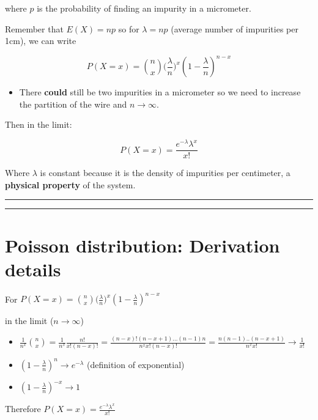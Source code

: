 \documentclass[
]{book}
\providecommand{\tightlist}{%
  \setlength{\itemsep}{0pt}\setlength{\parskip}{0pt}}
\begin{document}
where \(p\) is the probability of finding an impurity in a micrometer.

Remember that
\(E(X)=np\)
so for \(\lambda=np\) (average number of impurities per 1cm), we can write

\[P(X=x)=\binom n x \big(\frac{\lambda}{n}\big)^x(1-\frac{\lambda}{n})^{n-x}\]

\begin{itemize}
\tightlist
\item
  There \textbf{could} still be two impurities in a micrometer so we need to increase the partition of the wire and \(n \rightarrow \infty\).
\end{itemize}

Then in the limit:

\[P(X=x)= \frac{e^{-\lambda}\lambda^x}{x!}\]

Where \(\lambda\) is constant because it is the density of impurities per centimeter, a \textbf{physical property} of the system.

\begin{center}\rule{0.5\linewidth}{0.5pt}\end{center}

\begin{center}\rule{0.5\linewidth}{0.5pt}\end{center}

\hypertarget{poisson-distribution-derivation-details}{%
\section{Poisson distribution: Derivation details}\label{poisson-distribution-derivation-details}}

For \(P(X=x)=\binom n x \big(\frac{\lambda}{n}\big)^x(1-\frac{\lambda}{n})^{n-x}\)

in the limit (\(n \rightarrow \infty\))

\begin{itemize}
\tightlist
\item
  \(\frac{1}{n^x}\binom n x =\frac{1}{n^x}\frac{n!}{x! (n-x)!}=\frac{(n-x)!(n-x+1)...(n-1)n}{n^x x! (n-x)!}=\frac{n(n-1)..(n-x+1)}{n^x x!} \rightarrow \frac{1}{x!}\)
\item
  \((1-\frac{\lambda}{n})^{n} \rightarrow e^{-\lambda}\) (definition of exponential)
\item
  \((1-\frac{\lambda}{n})^{-x} \rightarrow 1\)
\end{itemize}

Therefore
\(P(X=x)= \frac{e^{-\lambda}\lambda^x}{x!}\)
\end{document}
